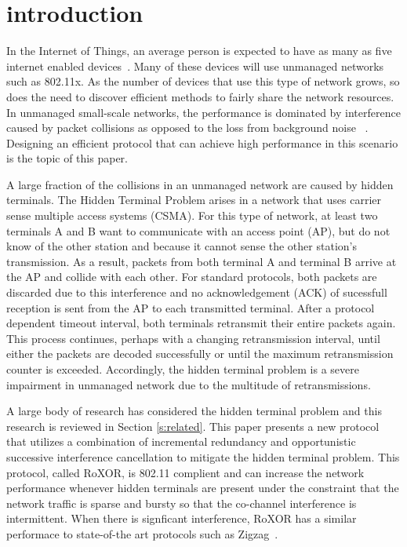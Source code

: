 \section{introduction}
\label{sec:intro}

In the Internet of Things, an average person is expected to have as many as five internet enabled devices~\cite{cisco}. Many of these devices will use unmanaged networks such as  802.11x. As the number of devices that use this type of network grows, so does the need to discover efficient  methods to fairly share the network resources. In unmanaged small-scale networks, the performance is dominated
by interference caused by packet collisions as opposed to the loss from background noise ~\cite{jigsaw}. Designing an efficient protocol that can achieve high performance in this scenario is the topic of this paper. 

A large fraction of the collisions in an unmanaged network are caused by hidden terminals.  The Hidden Terminal Problem arises in a network that uses carrier sense multiple access systems (CSMA). For this type of network, at least two terminals  A and B want to communicate with an access point (AP), but do not know of 
the other station and because it cannot sense the other station's transmission. As a result, packets from both terminal A and terminal B arrive at the AP and collide with each other. For standard protocols, both packets are discarded due to this interference and no acknowledgement (ACK)  of sucessfull reception is sent from the AP to each transmitted terminal. After a protocol dependent timeout interval, both terminals retransmit their entire packets again. This process continues, perhaps with a changing retransmission interval, until either the packets are decoded successfully or until the maximum retransmission counter is exceeded. Accordingly, the hidden terminal problem is a severe impairment in unmanaged network due to the multitude of retransmissions.

A large body of research has considered the hidden terminal problem and this research is reviewed in Section \ref{s:related}. This paper presents a new protocol that utilizes a combination of incremental redundancy and opportunistic successive interference cancellation to mitigate the hidden terminal problem. This protocol, called RoXOR, is 802.11 complient and can increase the network performance whenever hidden terminals are present under the constraint that the network traffic is sparse  and bursty so that the co-channel interference is intermittent. When there is signficant interference,  RoXOR has a similar performace to state-of-the art protocols such as Zigzag~\cite{zigzag}.

